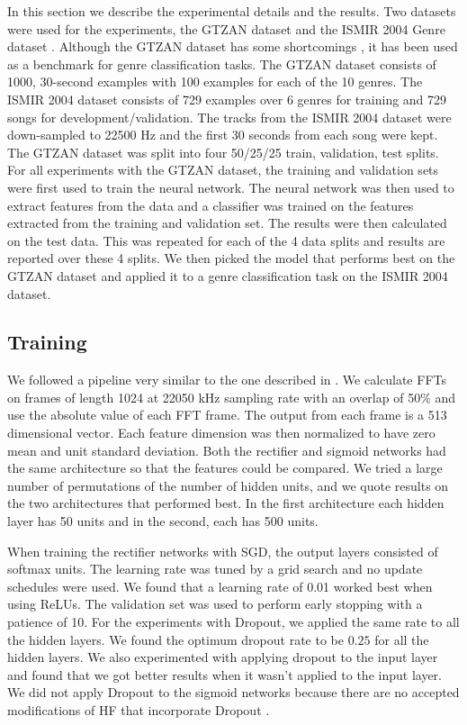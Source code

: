 \documentclass{article}
\begin{document}
In this section we describe the experimental details and the results. Two datasets were used for the experiments, the GTZAN dataset \cite{tzanetakis2002musical} and the ISMIR 2004 Genre dataset \cite{ismir2004}. Although the GTZAN dataset has some shortcomings \cite{Sturm:2012:AGM:2390848.2390851}, it has been used as a benchmark for genre classification tasks. The GTZAN dataset consists of 1000, 30-second examples with 100 examples for each of the 10 genres. The ISMIR 2004 dataset consists of 729 examples over 6 genres for training and 729 songs for development/validation. The tracks from the ISMIR 2004 dataset were down-sampled to 22500 Hz and the first 30 seconds from each song were kept. The GTZAN dataset was split into four 50/25/25 train, validation, test splits. For all experiments with the GTZAN dataset, the training and validation sets were first used to train the neural network. The neural network was then used to extract features from the data and a classifier was trained on the features extracted from the training and validation set. The results were then calculated on the test data. This was repeated for each of the 4 data splits and results are reported over these 4 splits. We then picked the model that performs best on the GTZAN dataset and applied it to a genre classification task on the ISMIR 2004 dataset. 

\vspace{-0.5em}
\subsection{Training}

We followed a pipeline very similar to the one described in \cite{hamel2010learning}. We calculate FFTs on frames of length 1024 at 22050 kHz sampling rate with an overlap of 50\% and use the absolute value of each FFT frame. The output from each frame is a 513 dimensional vector. Each feature dimension was then normalized to have zero mean and unit standard deviation. Both the rectifier and sigmoid networks had the same architecture so that the features could be compared. We tried a large number of permutations of the number of hidden units, and we quote results on the two architectures that performed best. In the first architecture each hidden layer has 50 units and in the second, each has 500 units. 

When training the rectifier networks with SGD, the output layers consisted of softmax units. The learning rate was tuned by a grid search and no update schedules were used. We found that a learning rate of 0.01 worked best when using ReLUs. The validation set was used to perform early stopping with a patience of 10. For the experiments with Dropout, we applied the same rate to all the hidden layers. We found the optimum dropout rate to be $0.25$ for all the hidden layers. We also experimented with applying dropout to the input layer and found that we got better results when it wasn't applied to the input layer.  We did not apply Dropout to the sigmoid networks because there are no accepted modifications of HF that incorporate Dropout \cite{dahl2013improving}. 
\end{document}
